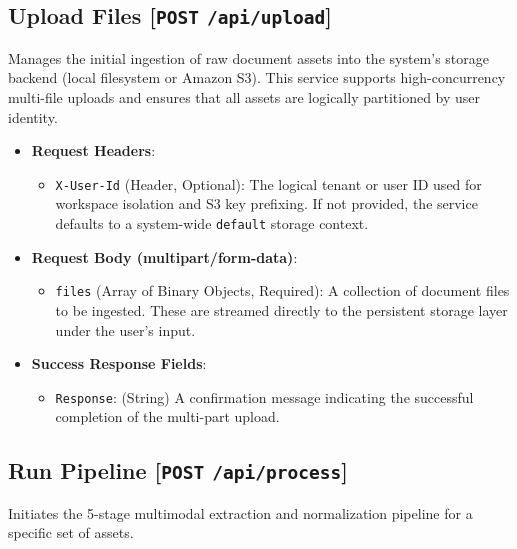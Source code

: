 \subsection{Upload Files [\texttt{POST} \texttt{/api/upload}]}
Manages the initial ingestion of raw document assets into the system's storage backend (local filesystem or Amazon S3). This service supports high-concurrency multi-file uploads and ensures that all assets are logically partitioned by user identity.

\begin{itemize}
    \item \textbf{Request Headers}:
    \begin{itemize}
        \item \texttt{X-User-Id} (Header, Optional): The logical tenant or user ID used for workspace isolation and S3 key prefixing. If not provided, the service defaults to a system-wide \texttt{default} storage context.
    \end{itemize}
    \item \textbf{Request Body (multipart/form-data)}:
    \begin{itemize}
        \item \texttt{files} (Array of Binary Objects, Required): A collection of document files to be ingested. These are streamed directly to the persistent storage layer under the user's input.
    \end{itemize}
    \item \textbf{Success Response Fields}:
    \begin{itemize}
        \item \texttt{Response}: (String) A confirmation message indicating the successful completion of the multi-part upload.
    \end{itemize}
\end{itemize}

\subsection{Run Pipeline [\texttt{POST} \texttt{/api/process}]}
Initiates the 5-stage multimodal extraction and normalization pipeline for a specific set of assets. 

